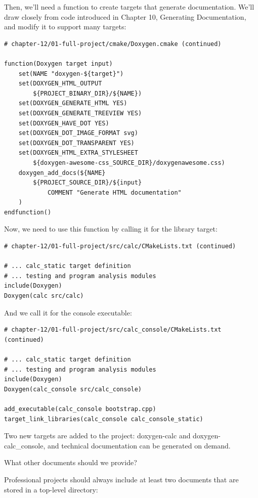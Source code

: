 Then, we'll need a function to create targets that generate documentation. We'll draw closely from code introduced in Chapter 10, Generating Documentation, and modify it to support many targets:

\begin{lstlisting}[style=styleCMake]
# chapter-12/01-full-project/cmake/Doxygen.cmake (continued)

function(Doxygen target input)
	set(NAME "doxygen-${target}")
	set(DOXYGEN_HTML_OUTPUT
		${PROJECT_BINARY_DIR}/${NAME})
	set(DOXYGEN_GENERATE_HTML YES)
	set(DOXYGEN_GENERATE_TREEVIEW YES)
	set(DOXYGEN_HAVE_DOT YES)
	set(DOXYGEN_DOT_IMAGE_FORMAT svg)
	set(DOXYGEN_DOT_TRANSPARENT YES)
	set(DOXYGEN_HTML_EXTRA_STYLESHEET
		${doxygen-awesome-css_SOURCE_DIR}/doxygenawesome.css)
	doxygen_add_docs(${NAME}
		${PROJECT_SOURCE_DIR}/${input}
			COMMENT "Generate HTML documentation"
	)
endfunction()
\end{lstlisting}

Now, we need to use this function by calling it for the library target:

\begin{lstlisting}[style=styleCMake]
# chapter-12/01-full-project/src/calc/CMakeLists.txt (continued)

# ... calc_static target definition
# ... testing and program analysis modules
include(Doxygen)
Doxygen(calc src/calc)
\end{lstlisting}

And we call it for the console executable:

\begin{lstlisting}[style=styleCMake]
# chapter-12/01-full-project/src/calc_console/CMakeLists.txt (continued)

# ... calc_static target definition
# ... testing and program analysis modules
include(Doxygen)
Doxygen(calc_console src/calc_console)

add_executable(calc_console bootstrap.cpp)
target_link_libraries(calc_console calc_console_static)
\end{lstlisting}

Two new targets are added to the project: doxygen-calc and doxygen-calc\_console, and technical documentation can be generated on demand.

What other documents should we provide?


Professional projects should always include at least two documents that are stored in a top-level directory:

